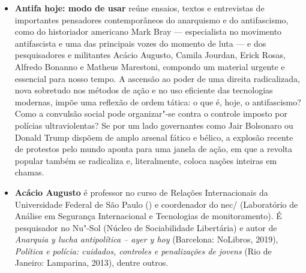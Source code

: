 \begin{itemize}
\item \textbf{Antifa hoje: modo de usar} reúne ensaios, textos e entrevistas de importantes pensadores contemporâneos do anarquismo e do antifascismo, como do historiador americano Mark Bray --- especialista no movimento antifascista e uma das principais vozes do momento de luta --- e dos pesquisadores e militantes Acácio Augusto, Camila Jourdan, Erick Rosas, Alfredo Bonanno e Matheus Marestoni, compondo um material urgente e essencial para nosso tempo.
A ascensão ao poder de uma direita radicalizada, nova sobretudo nos métodos de ação e no uso eficiente das tecnologias modernas, impõe uma reflexão de ordem tática: o que é, hoje, o antifascismo? Como a convulsão social pode organizar"-se contra o controle imposto por polícias ultraviolentas?
Se por um lado governantes como Jair Bolsonaro ou Donald Trump dispõem de amplo arsenal fático e bélico, a explosão recente de protestos pelo mundo aponta para uma janela de ação, em que a revolta popular também se radicaliza e, literalmente, coloca nações inteiras em chamas.


\item \textbf{Acácio Augusto} é professor no curso de Relações Internacionais da
  Universidade Federal de São Paulo () e coordenador do
  nec/ (Laboratório de Análise em Segurança Internacional e
  Tecnologias de monitoramento). É pesquisador no Nu"-Sol
  (Núcleo de Sociabilidade Libertária) e autor de
  \emph{Anarquia y lucha antipolítica -- ayer y hoy} (Barcelona:
    NoLibros, 2019), \emph{Política e polícia: cuidados, controles e
  penalizações de jovens} (Rio de Janeiro: Lamparina, 2013), dentre
  outros.

\end{itemize}

